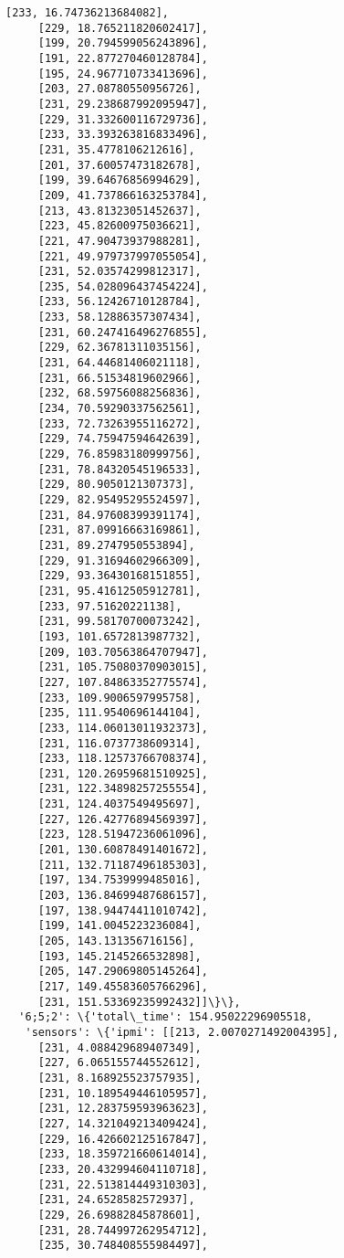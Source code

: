\documentclass[11pt]{article}
\begin{document}
\begin{tcolorbox}[breakable, size=fbox, boxrule=.5pt, pad at break*=1mm, opacityfill=0]
\begin{Verbatim}[commandchars=\\\{\}]
     [233, 16.74736213684082],
     [229, 18.765211820602417],
     [199, 20.794599056243896],
     [191, 22.877270460128784],
     [195, 24.967710733413696],
     [203, 27.08780550956726],
     [231, 29.238687992095947],
     [229, 31.332600116729736],
     [233, 33.393263816833496],
     [231, 35.4778106212616],
     [201, 37.60057473182678],
     [199, 39.64676856994629],
     [209, 41.737866163253784],
     [213, 43.81323051452637],
     [223, 45.82600975036621],
     [221, 47.90473937988281],
     [221, 49.979737997055054],
     [231, 52.03574299812317],
     [235, 54.028096437454224],
     [233, 56.12426710128784],
     [233, 58.12886357307434],
     [231, 60.247416496276855],
     [229, 62.36781311035156],
     [231, 64.44681406021118],
     [231, 66.51534819602966],
     [232, 68.59756088256836],
     [234, 70.59290337562561],
     [233, 72.73263955116272],
     [229, 74.75947594642639],
     [229, 76.85983180999756],
     [231, 78.84320545196533],
     [229, 80.9050121307373],
     [229, 82.95495295524597],
     [231, 84.97608399391174],
     [231, 87.09916663169861],
     [231, 89.2747950553894],
     [229, 91.31694602966309],
     [229, 93.36430168151855],
     [231, 95.41612505912781],
     [233, 97.51620221138],
     [231, 99.58170700073242],
     [193, 101.6572813987732],
     [209, 103.70563864707947],
     [231, 105.75080370903015],
     [227, 107.84863352775574],
     [233, 109.9006597995758],
     [235, 111.9540696144104],
     [233, 114.06013011932373],
     [231, 116.0737738609314],
     [233, 118.12573766708374],
     [231, 120.26959681510925],
     [231, 122.34898257255554],
     [231, 124.4037549495697],
     [227, 126.42776894569397],
     [223, 128.51947236061096],
     [201, 130.60878491401672],
     [211, 132.71187496185303],
     [197, 134.7539999485016],
     [203, 136.84699487686157],
     [197, 138.94474411010742],
     [199, 141.0045223236084],
     [205, 143.131356716156],
     [193, 145.2145266532898],
     [205, 147.29069805145264],
     [217, 149.45583605766296],
     [231, 151.53369235992432]]\}\},
  '6;5;2': \{'total\_time': 154.95022296905518,
   'sensors': \{'ipmi': [[213, 2.0070271492004395],
     [231, 4.088429689407349],
     [227, 6.065155744552612],
     [231, 8.168925523757935],
     [231, 10.189549446105957],
     [231, 12.283759593963623],
     [227, 14.321049213409424],
     [229, 16.426602125167847],
     [233, 18.359721660614014],
     [233, 20.432994604110718],
     [231, 22.513814449310303],
     [231, 24.6528582572937],
     [229, 26.69882845878601],
     [231, 28.744997262954712],
     [235, 30.748408555984497],

\end{Verbatim}
\end{tcolorbox}
\end{document}

